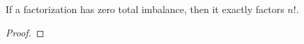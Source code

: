 \begin{lemma}
\label{balance-zero}
\leanok
If a factorization has zero total imbalance, then it exactly factors $n!$.
\end{lemma}
\begin{proof}
\leanok
\end{proof}
